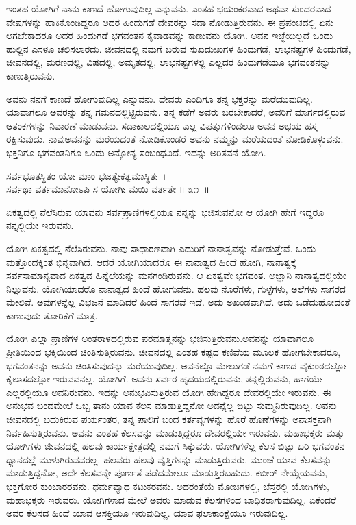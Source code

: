 ಇಂತಹ ಯೋಗಿಗೆ ನಾನು ಕಾಣದೆ ಹೋಗುವುದಿಲ್ಲ ಎನ್ನುವನು. ಎಂತಹ ಭಯಂಕರವಾದ ಅಥವಾ ಸುಂದರವಾದ ವೇಷಗಳನ್ನು ಹಾಕಿಕೊಂಡಿದ್ದರೂ ಅದರ ಹಿಂದುಗಡೆ ದೇವರನ್ನು ಸದಾ ನೋಡುತ್ತಿರುವನು. ಈ ಪ್ರಪಂಚದಲ್ಲಿ ಏನು ಆಗಬೇಕಾದರೂ ಅದರ ಹಿಂದುಗಡೆ ಭಗವಂತನ ಕೈವಾಡವನ್ನು ಕಾಣುವನು ಯೋಗಿ. ಅವನ ಇಚ್ಛೆಯಿಲ್ಲದೆ ಒಂದು ಹುಲ್ಲಿನ ಎಸಳೂ ಚಲಿಸಲಾರದು. ಜೀವನದಲ್ಲಿ ನಮಗೆ ಬರುವ ಸುಖದುಃಖಗಳ ಹಿಂದುಗಡೆ, ಲಾಭನಷ್ಟಗಳ ಹಿಂದುಗಡೆ, ಜೀವನದಲ್ಲಿ, ಮರಣದಲ್ಲಿ, ವಿಷದಲ್ಲಿ, ಅಮೃತದಲ್ಲಿ, ಲಾಭನಷ್ಟಗಳಲ್ಲಿ ಎಲ್ಲದರ ಹಿಂದುಗಡೆಯೂ ಭಗವಂತನನ್ನು ಕಾಣುತ್ತಿರುವನು.

ಅವನು ನನಗೆ ಕಾಣದೆ ಹೋಗುವುದಿಲ್ಲ ಎನ್ನುವನು. ದೇವರು ಎಂದಿಗೂ ತನ್ನ ಭಕ್ತರನ್ನು ಮರೆಯುವುದಿಲ್ಲ. ಯಾವಾಗಲೂ ಅವರನ್ನು ತನ್ನ ಗಮನದಲ್ಲಿಟ್ಟಿರುವನು. ತನ್ನ ಕಡೆಗೆ ಅವರು ಬರಬೇಕಾದರೆ, ಅವರಿಗೆ ಮಾರ್ಗದಲ್ಲಿರುವ ಆತಂಕಗಳನ್ನು ನಿವಾರಣೆ ಮಾಡುವನು. ಸದಾಕಾಲದಲ್ಲಿಯೂ ಎಲ್ಲ ವಿಪತ್ತುಗಳಿಂದಲೂ ಅವನ ಅಭಯ ಹಸ್ತ ರಕ್ಷಿಸುವುದು. ನಾವು\break ಅವನನ್ನು ಮರೆಯದಂತೆ ನೋಡಿಕೊಂಡರೆ ಅವನು ನಮ್ಮನ್ನು ಮರೆಯದಂತೆ ನೋಡಿಕೊಳ್ಳುವನು. ಭಕ್ತನಿಗೂ ಭಗವಂತನಿಗೂ ಒಂದು ಅನ್ಯೋನ್ಯ ಸಂಬಂಧವಿದೆ. ಇದನ್ನು ಅರಿತವನೆ ಯೋಗಿ.

\begin{shloka}
ಸರ್ವಭೂತಸ್ಥಿತಂ ಯೋ ಮಾಂ ಭಜತ್ಯೇಕತ್ವಮಾಸ್ಥಿತಃ~।\\ಸರ್ವಥಾ ವರ್ತಮಾನೋಽಪಿ ಸ ಯೋಗೀ ಮಯಿ ವರ್ತತೇ \hfill॥ ೩೧~॥
\end{shloka}

\begin{artha}
ಏಕತ್ವದಲ್ಲಿ ನೆಲೆಸಿರುವ ಯಾವನು ಸರ್ವಪ್ರಾಣಿಗಳಲ್ಲಿಯೂ ನನ್ನನ್ನು ಭಜಿಸುವನೋ ಆ ಯೋಗಿ ಹೇಗೆ ಇದ್ದರೂ ನನ್ನಲ್ಲಿಯೇ ಇರುವನು.
\end{artha}

ಯೋಗಿ ಏಕತ್ವದಲ್ಲಿ ನೆಲೆಸಿರುವನು. ನಾವು ಸಾಧಾರಣವಾಗಿ ಎದುರಿಗೆ ನಾನಾತ್ವವನ್ನು ನೋಡುತ್ತೇವೆ. ಒಂದು ಮತ್ತೊಂದಕ್ಕಿಂತ ಭಿನ್ನವಾಗಿದೆ. ಆದರೆ ಯೋಗಿಯಾದರೊ ಈ ನಾನಾತ್ವದ ಹಿಂದೆ ಹೋಗಿ, ನಾನಾತ್ವಕ್ಕೆ ಸರ್ವಸಾಮಾನ್ಯವಾದ ಏಕತ್ವದ ಹಿನ್ನೆಲೆಯನ್ನು ಮನಗಂಡಿರುವನು. ಆ ಏಕತ್ವವೇ ಭಗವಂತ. ಅಜ್ಞಾನಿ ನಾನಾತ್ವದಲ್ಲಿಯೇ ನಿಲ್ಲುವನು. ಯೋಗಿಯಾದರೊ ನಾನಾತ್ವದ ಹಿಂದೆ ಹೋಗುವನು. ಹಲವು ನೊರೆಗಳು, ಗುಳ್ಳೆಗಳು, ಅಲೆಗಳು ಸಾಗರದ ಮೇಲಿವೆ. ಅವುಗಳನ್ನೆಲ್ಲ ವಿಭಜನೆ ಮಾಡಿದರೆ ಹಿಂದೆ ಸಾಗರವೆ ಇದೆ. ಅದು ಅಖಂಡವಾಗಿದೆ. ಅದು ಒಡೆದು\-ಹೋದಂತೆ ಕಾಣುವುದು ತೋರಿಕೆಗೆ ಮಾತ್ರ.

ಯೋಗಿ ಎಲ್ಲಾ ಪ್ರಾಣಿಗಳ ಅಂತರಾಳದಲ್ಲಿರುವ ಪರಮಾತ್ಮನನ್ನು ಭಜಿಸುತ್ತಿರುವನು.\break ಅವನನ್ನು ಯಾವಾಗಲೂ ಪ್ರೀತಿಯಿಂದ ಭಕ್ತಿಯಿಂದ ಚಿಂತಿಸುತ್ತಿರುವನು. ಜೀವನದಲ್ಲಿ ಎಂತಹ ಕಷ್ಟದ ಕಣಿವೆಯ ಮೂಲಕ ಹೋಗಬೇಕಾದರೂ, ಭಗವಂತನನ್ನು ಅವನು ಚಿಂತಿಸುವುದನ್ನು ಮರೆಯುವುದಿಲ್ಲ. ಅವನೆಲ್ಲೊ ಮೇಲುಗಡೆ ನಮಗೆ ಕಾಣದ ವೈಕುಂಠದಲ್ಲೋ ಕೈಲಾಸದಲ್ಲೋ ಇರುವವನಲ್ಲ, ಯೋಗಿಗೆ. ಅವನು ಸರ್ವರ ಹೃದಯದಲ್ಲಿರುವನು, ತನ್ನಲ್ಲಿರುವನು, ಹಾಗೆಯೇ ಎಲ್ಲರಲ್ಲಿಯೂ ಅವನಿರುವನು. ಇದನ್ನು ಅನುಭವಿಸುತ್ತಿರುವ ಯೋಗಿ ಹೇಗಿದ್ದರೂ ದೇವರಲ್ಲಿಯೇ ಇರುವನು. ಈ ಅನುಭವ ಬಂದಮೇಲೆ ಒಬ್ಬ ತಾನು ಯಾವ ಕೆಲಸ ಮಾಡುತ್ತಿದ್ದನೋ ಅದನ್ನೆಲ್ಲ ಬಿಟ್ಟು ಸುಮ್ಮನಿರುವುದಿಲ್ಲ. ಅವನು ಜೀವನದಲ್ಲಿ ಬದುಕಿರುವ ಪರ್ಯಂತರ, ತನ್ನ ಪಾಲಿಗೆ ಬಂದ ಕರ್ತವ್ಯಗಳನ್ನು ಹೊರೆ ಹೊಣೆಗಳನ್ನು ಅನಾಸಕ್ತನಾಗಿ ನಿರ್ವಹಿಸುತ್ತಿರುವನು. ಅವನು ಎಂತಹ ಕೆಲಸವನ್ನು ಮಾಡುತ್ತಿದ್ದರೂ ದೇವರಲ್ಲಿಯೇ ಇರುವನು. ಮಹಾಭಕ್ತರು ಮತ್ತು ಯೋಗಿಗಳು ಜೀವನದಲ್ಲಿ ಹಲವು ಕಾರ್ಯಕ್ಷೇತ್ರದಲ್ಲಿ ನಮಗೆ ಸಿಕ್ಕುವರು. ಯೋಗಿಗಳೆಲ್ಲ ಕೆಲಸ ಬಿಟ್ಟು ಬರಿ ಭಗವಂತನ ಧ್ಯಾನದಲ್ಲೆ ಮುಳುಗಿರುವವರಲ್ಲ. ಹಲವರು ಹಲವು ವೃತ್ತಿಗಳನ್ನು ಮಾಡುತ್ತಿರುವರು. ಮುಂಚೆ ಯಾವ ಕೆಲಸವನ್ನು ಮಾಡುತ್ತಿದ್ದನೋ, ಅದೇ ಕೆಲಸವನ್ನೇ ಪೂರ್ಣತೆ ಪಡೆದಮೇಲೂ ಮಾಡುತ್ತಿರಬಹುದು. ಕಬೀರ್ ನೇಯ್ಗೆಯವನು, ಭಕ್ತಗೋರ ಕುಂಬಾರರವನು. ಧರ್ಮವ್ಯಾಧ ಕಟುಕರವನು. ಅದರಂತೆಯೆ ಮೋಚಿಗಳಲ್ಲಿ, ಬೆಸ್ತರಲ್ಲಿ ಯೋಗಿಗಳು, ಮಹಾಭಕ್ತರು ಇರುವರು. ಯೋಗಿಗಳಾದ ಮೇಲೆ ಅವರು ಮಾಡುವ ಕೆಲಸಗಳಿಂದ ಬಾಧಿತರಾಗುವುದಿಲ್ಲ. ಏಕೆಂದರೆ ಅವರ ಕೆಲಸದ ಹಿಂದೆ ಯಾವ ಆಸಕ್ತಿಯೂ ಇರುವುದಿಲ್ಲ. ಯಾವ ಫಲಾಕಾಂಕ್ಷೆಯೂ ಇರುವುದಿಲ್ಲ.

